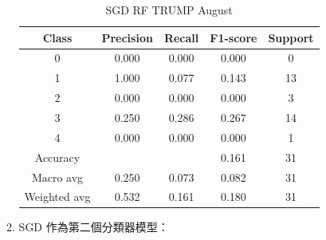 \begin{enumerate}
\begin{enumerate}
\begin{table}[H]
                \vspace{1em}
                
                \scriptsize
                \begin{tabular}{c|cccc}
                \hline
                Class & Precision & Recall & F1-score & Support \\
                \hline
                0 & 0.000 & 0.000 & 0.000 & 0 \\
                1 & 1.000 & 0.077 & 0.143 & 13 \\
                2 & 0.000 & 0.000 & 0.000 & 3 \\
                3 & 0.250 & 0.286 & 0.267 & 14 \\
                4 & 0.000 & 0.000 & 0.000 & 1 \\
                \hline
                Accuracy &       &      & 0.161 & 31 \\
                Macro avg & 0.250 & 0.073 & 0.082 & 31 \\
                Weighted avg & 0.532 & 0.161 & 0.180 & 31 \\
                \hline
                \end{tabular}
                \caption{SGD RF TRUMP August}
                \label{tab:classifier_2_report_sgd_rf_trump_non_filtered_aug}
                \end{table}


                \pagebreak
    
                \item SGD 作為第二個分類器模型：


\end{enumerate}
\end{enumerate}
